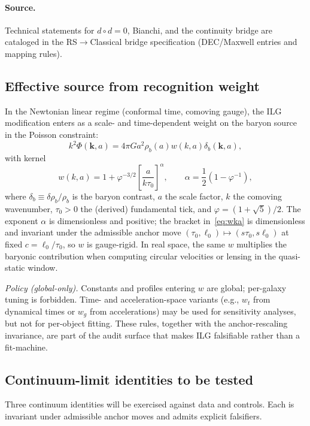 \documentclass[11pt]{article}
\begin{document}
\paragraph{Source.} Technical statements for $d\circ d=0$, Bianchi, and the continuity bridge are cataloged in the RS$\to$Classical bridge specification (DEC/Maxwell entries and mapping rules). 

\subsection{Effective source from recognition weight}
In the Newtonian linear regime (conformal time, comoving gauge), the ILG modification enters as a scale- and time-dependent weight on the baryon source in the Poisson constraint:
\begin{equation}\label{eq:poisson-ilg}
k^2\Phi(\mathbf{k},a) = 4\pi G a^2\rho_b(a) w(k,a)\delta_b(\mathbf{k},a),
\end{equation}
with kernel
\begin{equation}\label{eq:wka}
w(k,a) = 1+\varphi^{-3/2}\left[\frac{a}{k\tau_0}\right]^{\alpha}, 
\qquad \alpha = \frac{1}{2}\left(1-\varphi^{-1}\right),
\end{equation}
where $\delta_b\equiv \delta\rho_b/\rho_b$ is the baryon contrast, $a$ the scale factor, $k$ the comoving wavenumber, $\tau_0>0$ the (derived) fundamental tick, and $\varphi=(1+\sqrt{5})/2$. The exponent $\alpha$ is dimensionless and positive; the bracket in~\eqref{eq:wka} is dimensionless and invariant under the admissible anchor move $(\tau_0,\ell_0)\mapsto (s\tau_0, s\ell_0)$ at fixed $c=\ell_0/\tau_0$, so $w$ is gauge-rigid. In real space, the same $w$ multiplies the baryonic contribution when computing circular velocities or lensing in the quasi-static window.

\emph{Policy (global-only).} Constants and profiles entering $w$ are global; per-galaxy tuning is forbidden. Time- and acceleration-space variants (e.g., $w_t$ from dynamical times or $w_g$ from accelerations) may be used for sensitivity analyses, but not for per-object fitting. These rules, together with the anchor-rescaling invariance, are part of the audit surface that makes ILG falsifiable rather than a fit-machine. 

\subsection{Continuum-limit identities to be tested}
Three continuum identities will be exercised against data and controls. Each is invariant under admissible anchor moves and admits explicit falsifiers.
\end{document}
